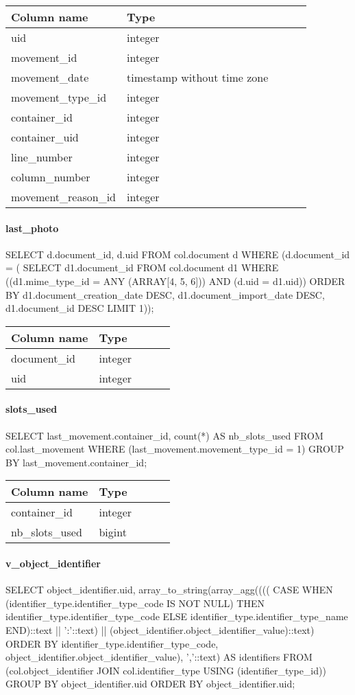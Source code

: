 \begin{tabular}{|l| p{2cm}|c|c| p{5cm}|}
\hline
Column name & Type \\
\hline
uid & integer\\
movement\_id & integer\\
movement\_date & timestamp without time zone\\
movement\_type\_id & integer\\
container\_id & integer\\
container\_uid & integer\\
line\_number & integer\\
column\_number & integer\\
movement\_reason\_id & integer\\
\hline
\end{tabular}
\paragraph{last\_photo}
 SELECT d.document\_id,
    d.uid
   FROM col.document d
  WHERE (d.document\_id = ( SELECT d1.document\_id
           FROM col.document d1
          WHERE ((d1.mime\_type\_id = ANY (ARRAY[4, 5, 6])) AND (d.uid = d1.uid))
          ORDER BY d1.document\_creation\_date DESC, d1.document\_import\_date DESC, d1.document\_id DESC
         LIMIT 1));

\begin{tabular}{|l| p{2cm}|c|c| p{5cm}|}
\hline
Column name & Type \\
\hline
document\_id & integer\\
uid & integer\\
\hline
\end{tabular}
\paragraph{slots\_used}
 SELECT last\_movement.container\_id,
    count(*) AS nb\_slots\_used
   FROM col.last\_movement
  WHERE (last\_movement.movement\_type\_id = 1)
  GROUP BY last\_movement.container\_id;

\begin{tabular}{|l| p{2cm}|c|c| p{5cm}|}
\hline
Column name & Type \\
\hline
container\_id & integer\\
nb\_slots\_used & bigint\\
\hline
\end{tabular}
\paragraph{v\_object\_identifier}
 SELECT object\_identifier.uid,
    array\_to\_string(array\_agg((((
        CASE
            WHEN (identifier\_type.identifier\_type\_code IS NOT NULL) THEN identifier\_type.identifier\_type\_code
            ELSE identifier\_type.identifier\_type\_name
        END)::text || ':'::text) || (object\_identifier.object\_identifier\_value)::text) ORDER BY identifier\_type.identifier\_type\_code, object\_identifier.object\_identifier\_value), ','::text) AS identifiers
   FROM (col.object\_identifier
     JOIN col.identifier\_type USING (identifier\_type\_id))
  GROUP BY object\_identifier.uid
  ORDER BY object\_identifier.uid;

